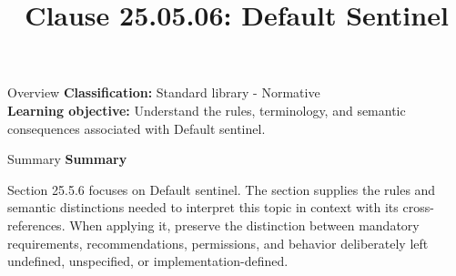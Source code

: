 \documentclass[10pt,letterpaper]{article}
\title{Clause 25.05.06: Default Sentinel}
\author{}
\date{}
\begin{document}
\maketitle
\begin{CornellOverviewBox}{Overview}
\textbf{Classification:} Standard library - Normative\\[2pt]
\textbf{Learning objective:} Understand the rules, terminology, and semantic consequences associated with Default sentinel.
\end{CornellOverviewBox}\begin{CornellSummaryBox}{Summary}
{\sffamily\bfseries\color{Accent} Summary}\par\vspace{3pt}Section 25.5.6 focuses on Default sentinel. The section supplies the rules and semantic distinctions needed to interpret this topic in context with its cross-references. When applying it, preserve the distinction between mandatory requirements, recommendations, permissions, and behavior deliberately left undefined, unspecified, or implementation-defined.
\end{CornellSummaryBox}
\end{document}
